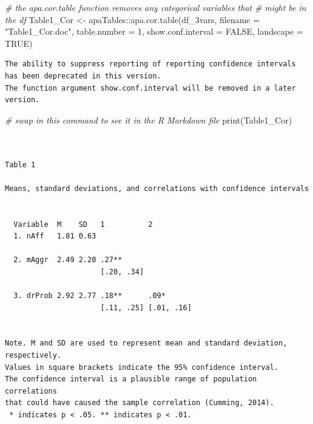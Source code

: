\documentclass[
  11pt,
]{book}
\newenvironment{Shaded}{\begin{snugshade}}{\end{snugshade}}
\newcommand{\AttributeTok}[1]{\textcolor[rgb]{0.77,0.63,0.00}{#1}}
\newcommand{\CommentTok}[1]{\textcolor[rgb]{0.56,0.35,0.01}{\textit{#1}}}
\newcommand{\ConstantTok}[1]{\textcolor[rgb]{0.00,0.00,0.00}{#1}}
\newcommand{\DecValTok}[1]{\textcolor[rgb]{0.00,0.00,0.81}{#1}}
\newcommand{\FunctionTok}[1]{\textcolor[rgb]{0.00,0.00,0.00}{#1}}
\newcommand{\NormalTok}[1]{#1}
\newcommand{\OtherTok}[1]{\textcolor[rgb]{0.56,0.35,0.01}{#1}}
\newcommand{\SpecialCharTok}[1]{\textcolor[rgb]{0.00,0.00,0.00}{#1}}
\newcommand{\StringTok}[1]{\textcolor[rgb]{0.31,0.60,0.02}{#1}}
\begin{document}
\begin{Shaded}
\begin{Highlighting}[]
\CommentTok{\# the apa.cor.table function removes any categorical variables that}
\CommentTok{\# might be in the df}
\NormalTok{Table1\_Cor }\OtherTok{\textless{}{-}}\NormalTok{ apaTables}\SpecialCharTok{::}\FunctionTok{apa.cor.table}\NormalTok{(df\_3vars, }\AttributeTok{filename =} \StringTok{"Table1\_Cor.doc"}\NormalTok{,}
    \AttributeTok{table.number =} \DecValTok{1}\NormalTok{, }\AttributeTok{show.conf.interval =} \ConstantTok{FALSE}\NormalTok{, }\AttributeTok{landscape =} \ConstantTok{TRUE}\NormalTok{)}
\end{Highlighting}
\end{Shaded}

\begin{verbatim}
The ability to suppress reporting of reporting confidence intervals has been deprecated in this version.
The function argument show.conf.interval will be removed in a later version.
\end{verbatim}

\begin{Shaded}
\begin{Highlighting}[]
\CommentTok{\# swap in this command to see it in the R Markdown file}
\FunctionTok{print}\NormalTok{(Table1\_Cor)}
\end{Highlighting}
\end{Shaded}

\begin{verbatim}


Table 1 

Means, standard deviations, and correlations with confidence intervals
 

  Variable  M    SD   1          2         
  1. nAff   1.81 0.63                      
                                           
  2. mAggr  2.49 2.20 .27**                
                      [.20, .34]           
                                           
  3. drProb 2.92 2.77 .18**      .09*      
                      [.11, .25] [.01, .16]
                                           

Note. M and SD are used to represent mean and standard deviation, respectively.
Values in square brackets indicate the 95% confidence interval.
The confidence interval is a plausible range of population correlations 
that could have caused the sample correlation (Cumming, 2014).
 * indicates p < .05. ** indicates p < .01.
 
\end{verbatim}
\end{document}
